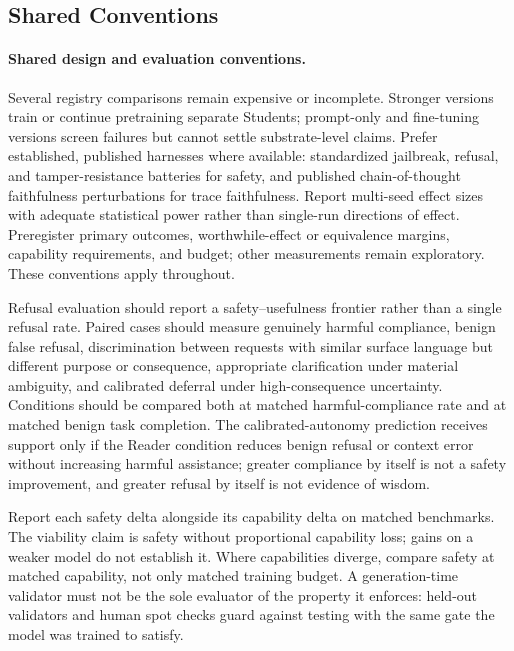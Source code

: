 \documentclass[11pt]{article}
\begin{document}
\subsection{Shared Conventions}\label{sec:shared-conventions}

\paragraph{Shared design and evaluation conventions.}
Several registry comparisons remain expensive or incomplete. Stronger versions
train or continue pretraining separate Students; prompt-only and fine-tuning
versions screen failures but cannot settle substrate-level claims. Prefer
established, published harnesses where available: standardized jailbreak,
refusal, and tamper-resistance batteries for safety, and published
chain-of-thought faithfulness perturbations for trace faithfulness. Report
multi-seed effect sizes with adequate statistical power rather than single-run
directions of effect. Preregister primary outcomes, worthwhile-effect or
equivalence margins, capability requirements, and budget; other measurements
remain exploratory. These conventions apply throughout.

Refusal evaluation should report a safety--usefulness frontier rather than a
single refusal rate. Paired cases should measure genuinely harmful compliance,
benign false refusal, discrimination between requests with similar surface
language but different purpose or consequence, appropriate clarification under
material ambiguity, and calibrated deferral under high-consequence uncertainty.
Conditions should be compared both at matched harmful-compliance rate and at
matched benign task completion. The calibrated-autonomy prediction receives
support only if the Reader condition reduces benign refusal or context error
without increasing harmful assistance; greater compliance by itself is not a
safety improvement, and greater refusal by itself is not evidence of wisdom.

Report each safety delta alongside its capability delta on matched benchmarks.
The viability claim is safety without proportional capability loss; gains on a
weaker model do not establish it. Where capabilities diverge, compare safety at
matched capability, not only matched training budget. A generation-time
validator must not be the sole evaluator of the property it enforces: held-out
validators and human spot checks guard against testing with the same gate the
model was trained to satisfy.
\end{document}
